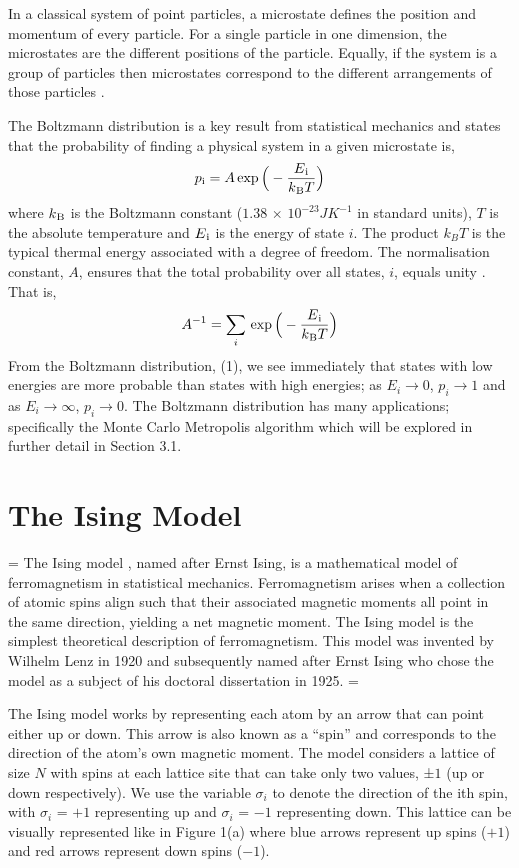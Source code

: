 \documentclass[a4paper]{article}
\begin{document}
In a classical system of point particles, a microstate defines the position and momentum of every particle. For a single particle in one dimension, the microstates are the different positions of the particle. Equally, if the system is a group of particles then microstates correspond to the different arrangements of those particles \cite{2}.

The Boltzmann distribution \cite{3} is a key result from statistical mechanics and states that the probability of finding a physical system in a given microstate is, 
 \begin{align} 
p\textsubscript{i} = A\exp \Big( - \frac{E\textsubscript{i}}{k\textsubscript{B} T}\Big)
\end{align}
where ${k\textsubscript{B}}$ is the Boltzmann constant ($1.38$ $\times$ $10^{-23}JK^{-1}$ in standard units), $T$ is the absolute temperature and $E\textsubscript{i}$ is the energy of state $i$. The product $k_{B}T$ is the typical thermal energy associated with a degree of freedom. The normalisation constant, $A$, ensures that the total probability over all states, $i$, equals unity \cite{2}. That is, 
\begin{align*}
A^{-1} = \sum_{i}  \,\exp \Big( - \frac{E\textsubscript{i}}{k\textsubscript{B} T}\Big) 
\end{align*}
From the Boltzmann distribution, (1), we see immediately that states with low energies are more probable than states with high energies; as $E_{i} \rightarrow 0 $, $p_{i} \rightarrow 1$ and as $E_{i} \rightarrow \infty $, $p_{i} \rightarrow 0$. The Boltzmann distribution has many applications; specifically the Monte Carlo Metropolis algorithm which will be explored in further detail in Section 3.1.

\section{The Ising Model}
\parskip = \baselineskip
The Ising model \cite{4}, named after Ernst Ising, is a mathematical model of ferromagnetism in statistical mechanics. Ferromagnetism arises when a collection of atomic spins align such that their associated magnetic moments all point in the same direction, yielding a net magnetic moment. The Ising model is the simplest theoretical description of ferromagnetism. This model was invented by Wilhelm Lenz in 1920 and subsequently named after Ernst Ising who chose the model as a subject of his doctoral dissertation in 1925.
\parskip = \baselineskip

The Ising model works by representing each atom by an arrow that can point either up or down. This arrow
is also known as a “spin” and corresponds to the direction of the atom’s own magnetic moment. The model considers a lattice of size $N$ with spins at each lattice site that can
take only two values, ±$1$ (up or down respectively). We use the variable $\sigma_{i}$ to denote the
direction of the ith spin, with $\sigma_{i}$ = $+1$ representing up and  $\sigma_{i}$ = $-1$ representing down.
This lattice can be visually represented like in Figure 1(a) where blue arrows represent up spins ($+1$) and
red arrows represent down spins ($-1$).
\end{document}
